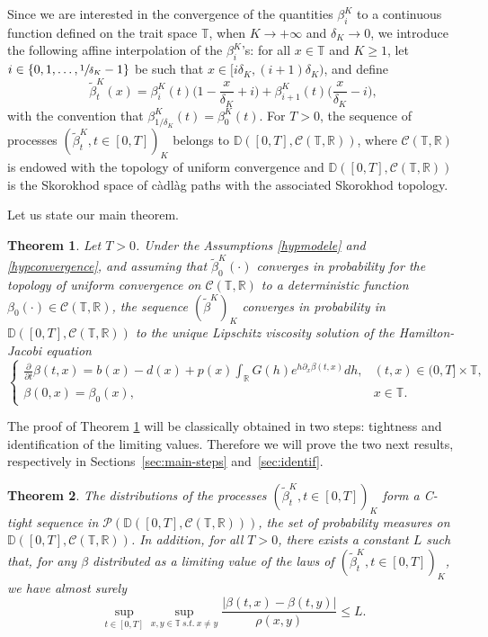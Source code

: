 \documentclass[10pt]{amsart}
\let\cal\mathcal
\let\f\frac
\theoremstyle{plain}
\newtheorem{theorem}{Theorem}[section]
\theoremstyle{remark}
\newcommand{\Co}{\mathcal{C}}
\newcommand\T{\mathbb{T}}
\newcommand\R{\mathbb{R}}
\let\dpl\displaystyle
\begin{document}
\par Since we are interested in the convergence of the quantities $\beta_i^K$ to a continuous function defined on the trait space $\T$, when $K\to+\infty$ and $\delta_K \to 0$, we introduce the following affine interpolation of the $\beta_i^K$'s:
for all $x\in\T$ and $K\geq 1$, let $i\in \{0, 1,\dots, \sfrac{1}{\delta_K}-1\}$ be such that $x\in [i\delta_K,(i+1)\delta_K)$, and define
\begin{equation}
\label{lafonction}
\widetilde \beta^K_{t}(x) =\beta_i^K(t)\Big(1-\f {x}{\delta_K}+i\Big)+\beta_{i+1}^K(t)\Big(\f {x}{\delta_K}-i\Big),
\end{equation}
with the convention that $\beta^K_{1/\delta_K}(t)=\beta^K_0(t)$.
For $T>0$, the sequence of processes $(\widetilde \beta^K_{t}, t\in[0,T])_{K}$ belongs to $\mathbb{D}([0,T], \Co(\T,\mathbb{R}))$, where $\Co(\T,\mathbb{R})$ is endowed with the topology of uniform convergence and $\mathbb{D}([0,T], \Co(\T,\mathbb{R}))$ is the Skorokhod space of càdlàg paths with the associated Skorokhod topology.

Let us state our main theorem.


\begin{theorem}\label{thm:main}
Let $T>0$. Under the Assumptions \ref{hypmodele} and \ref{hypconvergence}, and assuming that $\widetilde{\beta}^K_0(\cdot)$ converges in probability for the topology of uniform convergence on $\Co(\T,\mathbb{R})$ to a deterministic function $\beta_0(\cdot)\in \Co(\T,\mathbb{R})$,
the sequence $(\widetilde{\beta}^K)_K$ converges in probability in $\mathbb{D}([0,T], \Co(\T,\mathbb{R}))$ to the unique Lipschitz viscosity solution of the Hamilton-Jacobi equation
\begin{equation}
\label{eq:HJ}
\begin{cases}
\dpl\frac{\partial}{\partial t} \beta(t,x)=b(x)-d(x)+ p(x) \int_{\R} G(h)e^{h\partial_x \beta(t,x)} dh, & (t,x)\in (0,T]\times \T, \\
\beta(0,x)=\beta_0(x), & x\in \T.
\end{cases}
\end{equation}
\end{theorem}


The proof of Theorem \ref{thm:main} will be classically obtained in two steps: tightness and identification of the limiting values. Therefore we will prove the two next results, respectively in Sections~\ref{sec:main-steps} and~\ref{sec:identif}.

\begin{theorem}
\label{thm:tight}
The distributions of the processes $(\widetilde \beta^K_{t}, t\in[0,T])_{K}$ form a C-tight sequence in ${\cal P}(\mathbb{D}([0,T], \Co(\T,\mathbb{R})))$, the set of probability measures on $\mathbb{D}([0,T], \Co(\T,\mathbb{R}))$. In addition, for all $T>0$, there exists a constant $L$ such that, for any $\beta$ distributed as a limiting value of the laws of $(\widetilde \beta^K_{t}, t\in[0,T])_{K}$, we have almost surely
\begin{equation}
\label{eq:Lipschitz-estimate}
\sup_{t\in[0,T]}\sup_{x,y\in\T\ s.t.\ x\neq y}\frac{|\beta(t,x)-\beta(t,y)|}{\rho(x,y)}\leq L.
\end{equation}
\end{theorem}
\end{document}
